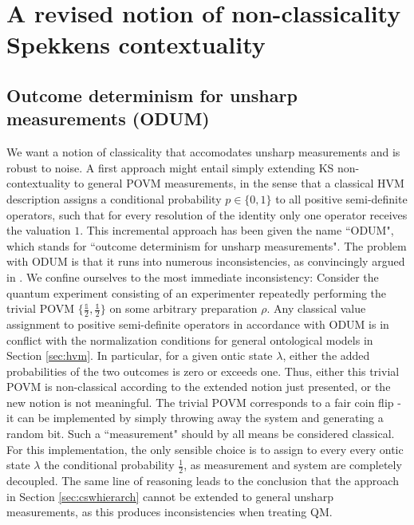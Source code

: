 \chapter[A revised notion of non-classicality \\ Spekkens contextuality]{A revised notion of non-classicality \\ \huge{Spekkens contextuality}}
\label{sec:spekkcont}
\section{Outcome determinism for unsharp measurements (ODUM)}
\label{sec:odum}
We want a notion of classicality that accomodates unsharp measurements and is robust to noise. A first approach might entail simply extending KS non-contextuality to general POVM measurements, in the sense that a classical HVM description assigns a conditional probability  $p\in\{0,1\}$ to all positive semi-definite operators, such that for every resolution of the identity only one operator receives the valuation $1$. This incremental approach has been given the name ``ODUM", which stands for ``outcome determinism for unsharp measurements". The problem with ODUM is that it runs into numerous inconsistencies, as convincingly argued in \cite{Spekkens2014}. We confine ourselves to the most immediate inconsistency: Consider the quantum experiment consisting of an experimenter repeatedly performing the trivial POVM $\{\frac{\mathbb{1}}{2},\frac{\mathbb{1}}{2}\}$ on some arbitrary preparation $\rho$. Any classical value assignment to positive semi-definite operators in accordance with ODUM is in conflict with the normalization conditions for general ontological models in Section \ref{sec:hvm}. In particular, for a given ontic state $\lambda$, either the added probabilities of the two outcomes is zero or exceeds one. Thus, either this trivial POVM is non-classical according to the extended notion just presented, or the new notion is not meaningful. The trivial POVM corresponds to a fair coin flip - it can be implemented by simply throwing away the system and generating a random bit. Such a ``measurement" should by all means be considered classical. For this implementation, the only sensible choice is to assign to every every ontic state $\lambda$ the conditional probability $\frac{1}{2}$, as measurement and system are completely decoupled. The same line of reasoning leads to the conclusion that the approach in Section \ref{sec:cswhierarch} cannot be extended to general unsharp measurements, as this produces inconsistencies when treating QM.

